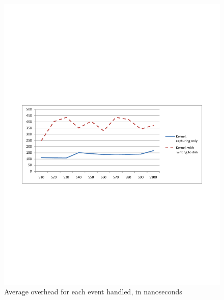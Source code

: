 \begin{figure}[h] 
\begin{centering} 
\includegraphics[scale=0.6, clip=true, viewport=1cm 10cm 20cm 19cm]{images/diagrams/Performance_Avg.pdf} 
\caption{Average overhead for each event handled, in nanoseconds} 
\label{Performance_Avg} 
\end{centering} 
\end{figure}

